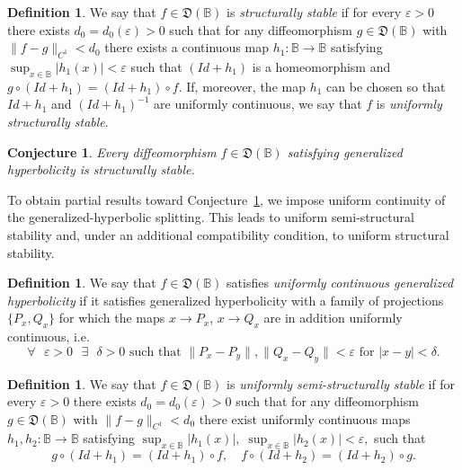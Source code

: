 \documentclass[12pt]{article}
\newcommand{\Bb}{\mathbb{B}}
\newcommand{\DUC}{\mathfrak{D}}
\newtheorem{conj}[thm]{Conjecture}
\theoremstyle{definition}
\newtheorem{defin}[thm]{Definition}
\begin{document}
\begin{defin}
We say that $f \in \DUC(\Bb)$ is \textit{structurally stable} if for every $\varepsilon > 0$ there exists $d_0 = d_0(\varepsilon) > 0$ such that for any diffeomorphism $g \in \DUC(\Bb)$ with $\|f-g\|_{C^1} < d_0$ there exists a continuous map $h_1: \Bb \to \Bb$ satisfying $\sup_{x \in \Bb}|h_1(x)| < \varepsilon$ such that $(Id+h_1)$ is a homeomorphism and $g \circ (Id+h_1) = (Id+ h_1) \circ f$. If, moreover, the map $h_1$ can be chosen so that $Id+h_1$ and $(Id+h_1)^{-1}$ are uniformly continuous, we say that $f$ is \textit{uniformly structurally stable}.
\end{defin}

\begin{conj}\label{conj:SS-general}
Every diffeomorphism $f \in \DUC(\Bb)$ satisfying generalized hyperbolicity is structurally stable.
\end{conj}

To obtain partial results toward Conjecture~\ref{conj:SS-general}, we impose uniform continuity of the generalized-hyperbolic splitting.
This leads to uniform semi-structural stability and, under an additional compatibility condition, to uniform structural stability.

\begin{defin}
We say that $f \in \DUC(\Bb)$ satisfies \textit{uniformly continuous generalized hyperbolicity} if it satisfies generalized hyperbolicity with a family of projections $\{P_x, Q_x\}$ for which the maps $x \to P_x$, $x \to Q_x$ are in addition uniformly continuous, i.e.
\begin{equation}\label{eq:cont-PQ}
    \mbox{$\forall$ $\varepsilon > 0$ $\exists$ $\delta > 0$ such that $\|P_x - P_y\|, \|Q_x - Q_y\| < \varepsilon$ for $|x-y| < \delta$}. 
\end{equation}
\end{defin}

\begin{defin}\label{def:semi-SS}
We say that $f \in \DUC(\Bb)$ is \textit{uniformly semi-structurally stable} if for every $\varepsilon > 0$ there exists $d_0 = d_0(\varepsilon) > 0$ such that for any diffeomorphism $g \in \DUC(\Bb)$ with $\|f-g\|_{C^1} < d_0$ there exist uniformly continuous maps $h_1, h_2: \Bb \to \Bb$ satisfying
$
\sup_{x \in \Bb}|h_1(x)|, \; \sup_{x \in \Bb}|h_2(x)| < \varepsilon,
$
such that 
$$
g \circ (Id + h_1) = (Id + h_1) \circ f, \quad f \circ (Id + h_2) = (Id + h_2) \circ g.
$$
\end{defin}
\end{document}
